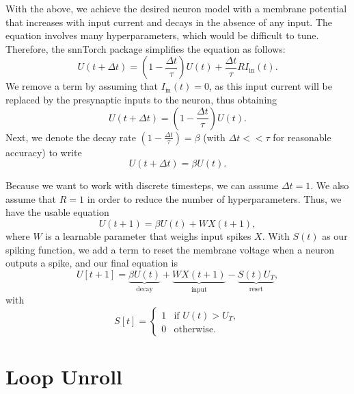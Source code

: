 \documentclass [MS] {UCLAthesis}
\begin{document}

With the above, we achieve the desired neuron model with a membrane potential that increases with input current and decays in the absence of any input. The equation involves many hyperparameters, which would be difficult to tune. Therefore, the snnTorch package simplifies the equation as follows:
\begin{equation}
   U(t + \Delta t) = (1 - \frac{\Delta t}{\tau}) U(t) + \frac{\Delta t}{\tau} R I_\text{in}(t).  
\end{equation}
We remove a term by assuming that $ I_\text{in}(t) = 0 $, as this input current will be replaced by the presynaptic inputs to the neuron, thus obtaining
\begin{equation}
     U(t + \Delta t) = (1 - \frac{\Delta t}{\tau}) U(t).
\end{equation}
Next, we denote the decay rate $(1 - \frac{\Delta t}{\tau}) = \beta$ (with $ \Delta t << \tau $ for reasonable accuracy) to write
\begin{equation}
    U(t + \Delta t) = \beta U(t).
\end{equation}

Because we want to work with discrete timesteps, we can assume $\Delta t = 1$. We also assume that $R=1$ in order to reduce the number of hyperparameters. Thus, we have the usable equation
\begin{equation}
   U(t+1) = \beta U(t) + W X(t+1), 
\end{equation}
where $W$ is a learnable parameter that weighs input spikes $X$. With $S(t)$ as our spiking function, we add a term to reset the membrane voltage when a neuron outputs a spike, and our final equation is
\begin{equation}
    U[t+1] = \underbrace{\beta U(t)}_{\text{decay}}
+ \underbrace{W X(t+1)}_{\text{input}}
- \underbrace{S(t)U_T}_{\text{reset}},
\end{equation}
with
\begin{equation}
    S[t] = \begin{cases} 
      1 & \text{if } U(t) > U_T, \\
      0 & \text{otherwise.}
      \end{cases}
\end{equation}


\section{Loop Unroll}
\end{document}

